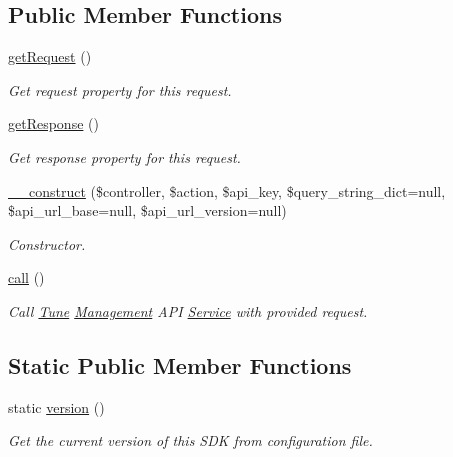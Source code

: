 \subsection*{Public Member Functions}
\begin{DoxyCompactItemize}
\item 
\hyperlink{classTune_1_1Management_1_1Service_1_1TuneManagementClient_a64423fc4534d5591a77d47fec4227356}{get\-Request} ()
\begin{DoxyCompactList}\small\item\em Get request property for this request. \end{DoxyCompactList}\item 
\hyperlink{classTune_1_1Management_1_1Service_1_1TuneManagementClient_aa60610ddaa2250a04a148f20580895b1}{get\-Response} ()
\begin{DoxyCompactList}\small\item\em Get response property for this request. \end{DoxyCompactList}\item 
\hyperlink{classTune_1_1Management_1_1Service_1_1TuneManagementClient_a9a04d228a1268e2cd67b41c367970c01}{\-\_\-\-\_\-construct} (\$controller, \$action, \$api\-\_\-key, \$query\-\_\-string\-\_\-dict=null, \$api\-\_\-url\-\_\-base=null, \$api\-\_\-url\-\_\-version=null)
\begin{DoxyCompactList}\small\item\em Constructor. \end{DoxyCompactList}\item 
\hyperlink{classTune_1_1Management_1_1Service_1_1TuneManagementClient_a4ab26d12df7975eee3853c1395a9910d}{call} ()
\begin{DoxyCompactList}\small\item\em Call \hyperlink{namespaceTune}{Tune} \hyperlink{namespaceTune_1_1Management}{Management} A\-P\-I \hyperlink{namespaceTune_1_1Management_1_1Service}{Service} with provided request. \end{DoxyCompactList}\end{DoxyCompactItemize}
\subsection*{Static Public Member Functions}
\begin{DoxyCompactItemize}
\item 
static \hyperlink{classTune_1_1Management_1_1Service_1_1TuneManagementClient_a40e207c1869e4081433ff051137e8dff}{version} ()
\begin{DoxyCompactList}\small\item\em Get the current version of this S\-D\-K from configuration file. \end{DoxyCompactList}\end{DoxyCompactItemize}


